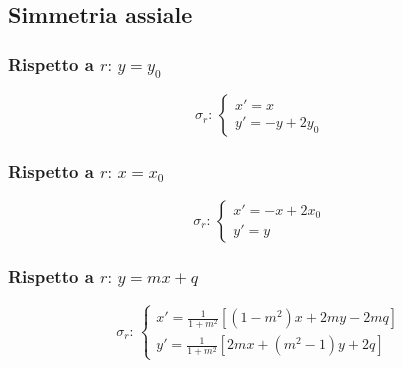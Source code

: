 \subsection{Simmetria assiale}
\begin{center}
\end{center}

\subsubsection{Rispetto a $r:\,y=y_0$}
\begin{equation*}
  \sigma_r:\,\begin{cases}
    x'= x\\
    y'= -y+2y_0
  \end{cases}
\end{equation*}

\subsubsection{Rispetto a $r:\,x=x_0$}
\begin{equation*}
  \sigma_r:\,\begin{cases}
    x'= -x+2x_0\\
    y'=y
  \end{cases}
\end{equation*}

\subsubsection{Rispetto a $r:\,y=mx+q$}
\begin{equation*}
  \sigma_r:\,\begin{cases}
    x'=\frac{1}{1+m^2}[(1-m^2)x+2my-2mq]\\
    y'=\frac{1}{1+m^2}[2mx+(m^2-1)y+2q]
  \end{cases}
\end{equation*}

